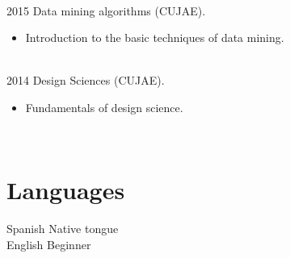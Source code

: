 \documentclass[letterpaper]{twentysecondcv} %
\begin{document}
\begin{twenty}
{{\begin{itemize}
		\end{itemize}}
        }
        \\
\twentyitem
    	{2015}
		{}
        {Data mining algorithms (CUJAE).}
        {}
        {}
        {
        {\begin{itemize}
        \item Introduction to the basic techniques of data mining.
		\end{itemize}}
        }
         \\
\twentyitem
    	{2014}
		{}
        {Design Sciences (CUJAE).}
        {}
        {}
        {
        {\begin{itemize}
        \item Fundamentals of design science.
		\end{itemize}}
        }

\end{twenty}
\pagebreak

\begin{twenty}
\twentyitem
    	{}
		{}
        {}
        {}
        {}
        {}
        \\
 \end{twenty} 
\section{Languages}

\begin{twenty} %
\twentyitem
    	{Spanish}
		{}
        {Native tongue}
        {}
        {}
        {}
        \\
	\twentyitem
    	{English}
		{}
        {Beginner}
        {}
        {}
        {}


\end{twenty}

\end{document}
